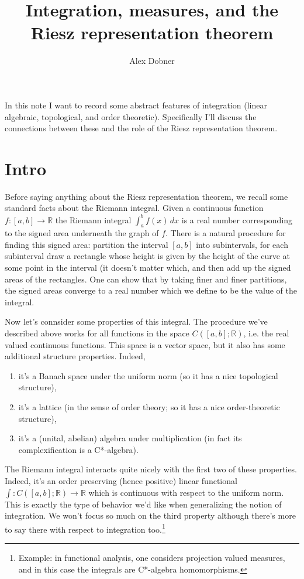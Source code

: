\documentclass[a4paper,11pt,twoside]{amsart}
\newcommand{\R}{\mathbb{R}}
\theoremstyle{definition}
\begin{document}
\title{Integration, measures, and the Riesz representation theorem}
\author{Alex Dobner}
\address{Department of Mathematics, University of Michigan \\
530 Church St\\
Ann Arbor, MI 48109}
\maketitle

In this note I want to record some abstract features of integration (linear algebraic, topological, and order theoretic). Specifically I'll discuss the connections between these and the role of the Riesz representation theorem.

\section{Intro}
Before saying anything about the Riesz representation theorem, we recall some standard facts about the Riemann integral. Given a continuous function $f \colon [a,b] \to \R$ the Riemann integral $\int_a^b f(x)\, dx$ is a real number corresponding to the signed area underneath the graph of $f$. There is a natural procedure for finding this signed area: partition the interval $[a,b]$ into subintervals, for each subinterval draw a rectangle whose height is given by the height of the curve at some point in the interval (it doesn't matter which, and then add up the signed areas of the rectangles. One can show that by taking finer and finer partitions, the signed areas converge to a real number which we define to be the value of the integral.

Now let's connsider some properties of this integral. The procedure we've described above works for all functions in the space $C([a,b];\R)$, i.e. the real valued continuous functions. This space is a vector space, but it also has some additional structure properties. Indeed,
\begin{enumerate}
    \item it's a Banach space under the uniform norm (so it has a nice topological structure),
    \item it's a lattice (in the sense of order theory; so it has a nice order-theoretic structure),
    \item it's a (unital, abelian) algebra under multiplication (in fact its complexification is a C*-algebra).
\end{enumerate}

The Riemann integral interacts quite nicely with the first two of these properties. Indeed, it's an order preserving (hence positive) linear functional $\int \colon C([a,b];\R) \to \R$ which is continuous with respect to the uniform norm. This is exactly the type of behavior we'd like when generalizing the notion of integration. We won't focus so much on the third property although there's more to say there with respect to integration too.\footnote{Example: in functional analysis, one considers projection valued measures, and in this case the integrals are C*-algebra homomorphisms.}
\end{document}
